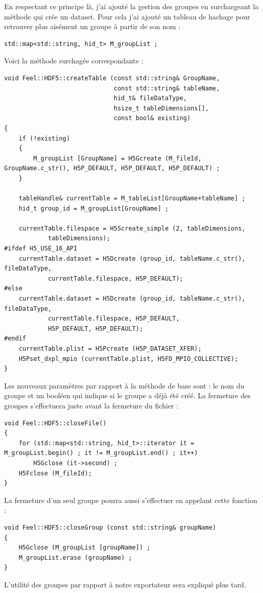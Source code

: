 \documentclass[12pt]{article}
\begin{document}
En respectant ce principe là, j'ai ajouté la gestion des groupes en surchargeant la méthode qui crée un dataset. \newline
Pour cela j'ai ajouté un tableau de hachage pour retrouver plus aisément un groupe à partir de son nom : 
\begin{verbatim}
std::map<std::string, hid_t> M_groupList ;
\end{verbatim}
Voici la méthode surchagée correspondante :
\begin{lstlisting}
void Feel::HDF5::createTable (const std::string& GroupName, 
                              const std::string& tableName, 
                              hid_t& fileDataType, 
                              hsize_t tableDimensions[], 
                              const bool& existing)
{
    if (!existing)
    {   
        M_groupList [GroupName] = H5Gcreate (M_fileId, GroupName.c_str(), H5P_DEFAULT, H5P_DEFAULT, H5P_DEFAULT) ;
    }

    tableHandle& currentTable = M_tableList[GroupName+tableName] ;
    hid_t group_id = M_groupList[GroupName] ;

    currentTable.filespace = H5Screate_simple (2, tableDimensions,
            tableDimensions);
#ifdef H5_USE_16_API
    currentTable.dataset = H5Dcreate (group_id, tableName.c_str(), fileDataType,
            currentTable.filespace, H5P_DEFAULT);
#else
    currentTable.dataset = H5Dcreate (group_id, tableName.c_str(), fileDataType,
            currentTable.filespace, H5P_DEFAULT,
            H5P_DEFAULT, H5P_DEFAULT);
#endif
    currentTable.plist = H5Pcreate (H5P_DATASET_XFER);
    H5Pset_dxpl_mpio (currentTable.plist, H5FD_MPIO_COLLECTIVE);
}
\end{lstlisting}
Les nouveaux paramètres par rapport à la méthode de base sont : le nom du groupe et un booléen qui indique si le groupe a déjà été créé. \newline
La fermeture des groupes s'effectuera juste avant la fermeture du fichier :
\begin{lstlisting}
void Feel::HDF5::closeFile()
{
    for (std::map<std::string, hid_t>::iterator it = M_groupList.begin() ; it != M_groupList.end() ; it++)
        H5Gclose (it->second) ;
    H5Fclose (M_fileId);
}
\end{lstlisting}
La fermeture d'un seul groupe pourra aussi s'effectuer en appelant cette fonction :
\begin{lstlisting}
void Feel::HDF5::closeGroup (const std::string& groupName)
{
    H5Gclose (M_groupList [groupName]) ;
    M_groupList.erase (groupName) ;
}
\end{lstlisting}
L'utilité des groupes par rapport à notre exportateur sera expliqué plus tard.
\newpage
\end{document}
